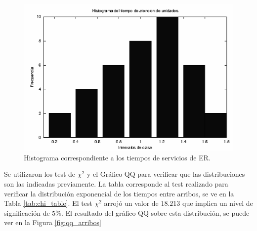 \documentclass[a4paper,10pt]{article}
\begin{document}
\begin{figure}[ht]
\begin{center}
\includegraphics[width=12cm]{../src/parteA/hist_servicios.eps}
\caption{\label{fig:hist_servicios} Histograma correspondiente a los tiempos de servicios de ER.}
\end{center}
\end{figure}

Se utilizaron los test de  $\chi^2$ y el Gráfico QQ para verificar que las distribuciones son las indicadas previamente. La tabla corresponde al test realizado para verificar la distribución exponencial de los tiempos entre arribos, se ve en la Tabla \ref{tab:chi_table}. El test $\chi^2$ arrojó un valor de $18.213$ que implica un nivel de significación de $5\%$. El resultado del gráfico QQ sobre esta distribución, se puede ver en la Figura  \ref{fig:qq_arribos}
\end{document}
